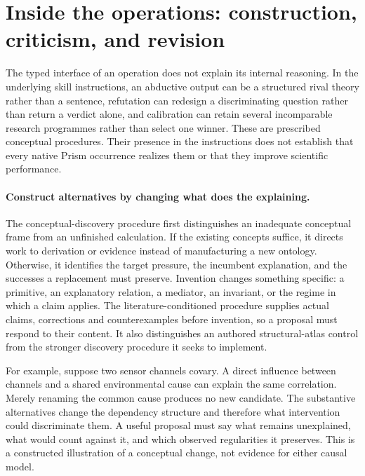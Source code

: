 %
%
%
\section{Inside the operations: construction, criticism, and revision}
\label{sec:mechanism-depth}
The typed interface of an operation does not explain its internal reasoning. In the underlying skill instructions, an abductive output can be a structured rival theory rather than a sentence, refutation can redesign a discriminating question rather than return a verdict alone, and calibration can retain several incomparable research programmes rather than select one winner. These are prescribed conceptual procedures. Their presence in the instructions does not establish that every native Prism occurrence realizes them or that they improve scientific performance.

\paragraph{Construct alternatives by changing what does the explaining.}
The conceptual-discovery procedure first distinguishes an inadequate conceptual frame from an unfinished calculation. If the existing concepts suffice, it directs work to derivation or evidence instead of manufacturing a new ontology. Otherwise, it identifies the target pressure, the incumbent explanation, and the successes a replacement must preserve. Invention changes something specific: a primitive, an explanatory relation, a mediator, an invariant, or the regime in which a claim applies. The literature-conditioned procedure supplies actual claims, corrections and counterexamples before invention, so a proposal must respond to their content. It also distinguishes an authored structural-atlas control from the stronger discovery procedure it seeks to implement.

For example, suppose two sensor channels covary. A direct influence between channels and a shared environmental cause can explain the same correlation. Merely renaming the common cause produces no new candidate. The substantive alternatives change the dependency structure and therefore what intervention could discriminate them. A useful proposal must say what remains unexplained, what would count against it, and which observed regularities it preserves. This is a constructed illustration of a conceptual change, not evidence for either causal model.

